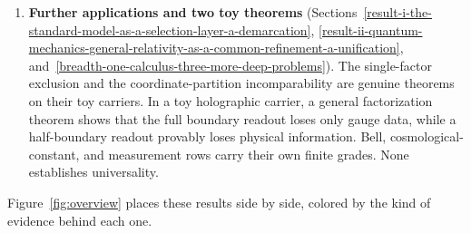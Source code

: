 \documentclass[11pt]{article}
\theoremstyle{definition}
\begin{document}
\begin{enumerate}
  The first asks whether the same min-cut data can hide different geometries. Its graph-level subproblem shows that,
  for nineteen exact equal-cut pairs, the two sets of presentations reachable by forward reduction moves are disjoint.
  Whether they are disjoint under arbitrary moves in both directions remains open. Its state-level subproblem finds six
  exact pairs with identical cut and state data, all of which turn out to be gauge-equivalent tensor networks. The
  second and third programs, on whether gravity must act as a classical record channel and on which invariant
  operators persist as records, remain open. Their finite precursors are, respectively, conditional on an assumed
  channel and sensitive to how records are defined.
\item
  \textbf{Further applications and two toy theorems} (Sections~\ref{result-i-the-standard-model-as-a-selection-layer-a-demarcation},
  \ref{result-ii-quantum-mechanics-general-relativity-as-a-common-refinement-a-unification},
  and~\ref{breadth-one-calculus-three-more-deep-problems}). The single-factor exclusion and the coordinate-partition
  incomparability are genuine theorems on their toy carriers. In a toy holographic carrier, a general factorization
  theorem shows that the full boundary readout loses only gauge data, while a half-boundary readout provably loses
  physical information. Bell, cosmological-constant, and measurement rows carry their own finite grades. None
  establishes universality.
\end{enumerate}

Figure~\ref{fig:overview} places these results side by side, colored by the kind of evidence behind each one.
\end{document}
